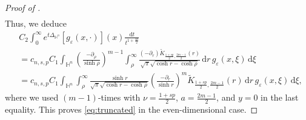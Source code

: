 \documentclass[11pt]{amsart}
\theoremstyle{plain}
\theoremstyle{definition}
\numberwithin{equation}{section}
\begin{document}
\begin{proof} [Proof of ]
\begin{equation*}
\begin{split}
\end{split}
\end{equation*}
Thus, we deduce
\begin{equation*}
\begin{split}
&C_{2} \int_{0}^{\infty} e^{t\Delta_{\mathbb{H}^{n}}}[g_{\varepsilon}(x,\cdot)](x) \frac{\mathrm{d}t}{t^{1+\frac{sp}{2}}} \\
&= c_{n, s, p} C_{1} \int_{\mathbb{H}^{n}} \left( \frac{-\partial_\rho}{\sinh \rho} \right)^{m-1} \int_{\rho}^{\infty} \frac{(-\partial_r) \widetilde{K}_{\frac{1+sp}{2},\frac{2m-1}{2}}(r)}{\sqrt{\pi}\sqrt{\cosh r-\cosh \rho}} \,\mathrm{d}r \, g_{\varepsilon}(x, \xi) \,\mathrm{d}\xi \\
&= c_{n, s, p} C_{1} \int_{\mathbb{H}^{n}} \int_{\rho}^{\infty} \frac{\sinh r}{\sqrt{\pi}\sqrt{\cosh r-\cosh \rho}} \left(\frac{-\partial_r}{\sinh r} \right)^{m} \widetilde{K}_{\frac{1+sp}{2},\frac{2m-1}{2}}(r) \,\mathrm{d}r \, g_{\varepsilon}(x, \xi) \,\mathrm{d}\xi,
\end{split}
\end{equation*}
where we used  $(m-1)$-times with $\nu = \frac{1+sp}{2}$, $a=\frac{2m-1}{2}$, and $y = 0$ in the last equality. This proves \eqref{eq:truncated} in the even-dimensional case.


\end{proof}
\end{document}
